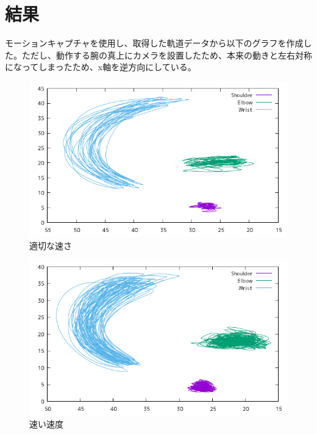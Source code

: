 \documentclass{jsarticle}
\begin{document}
\section{結果}
モーションキャプチャを使用し、取得した軌道データから以下のグラフを作成した。ただし、動作する腕の真上にカメラを設置したため、本来の動きと左右対称になってしまったため、x軸を逆方向にしている。
\begin{figure}[h]
  \begin{center}
    \includegraphics[clip,width=150mm]{Graph_2.png}
    \caption{適切な速さ \label{fig1}}
  \end{center}
\end{figure}
\begin{figure}[h]
  \begin{center}
    \includegraphics[clip,width=150mm]{Graph_3.png}
    \caption{速い速度 \label{fig:2}}
  \end{center}
\end{figure}
\end{document}
